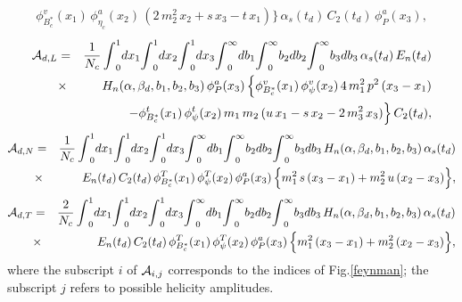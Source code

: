 \documentclass[preprint,superscriptaddress,nofootinbib]{revtex4}
\begin{document}
\begin{appendix}
\begin{eqnarray}
  {\phi}_{B_{c}^{\ast}}^{v}(x_{1})\, {\phi}_{{\eta}_{c}}^{a}(x_{2})\,
   (2\,m_{2}^{2}\,x_{2}+s\,x_{3}-t\,x_{1}) \Big\}\,
  {\alpha}_{s}(t_{d})\, C_{2}(t_{d})\, {\phi}_{P}^{a}(x_{3})
   \label{amp:d-01},
   \end{eqnarray}
   \begin{eqnarray}
  {\cal A}_{d,L} &=&
   \frac{1}{N_{c}}\,
  {\int}_{0}^{1}dx_{1}
  {\int}_{0}^{1}dx_{2}
  {\int}_{0}^{1}dx_{3}
  {\int}_{0}^{\infty}db_{1}
  {\int}_{0}^{\infty}b_{2}db_{2}
  {\int}_{0}^{\infty}b_{3}db_{3}\,
  {\alpha}_{s}(t_{d})\, E_{n}(t_{d})
   \nonumber \\ &{\times}&
  H_{n}({\alpha},{\beta}_{d},b_{1},b_{2},b_{3})\,
  {\phi}_{P}^{a}(x_{3})\, \Big\{
  {\phi}_{B_{c}^{\ast}}^{v}(x_{1})\, {\phi}_{\psi}^{v}(x_{2})\,
  4\,m_{1}^{2}\,p^{2}\,(x_{3}-x_{1})
  \nonumber \\ & & \quad -
 {\phi}_{B_{c}^{\ast}}^{t}(x_{1})\, {\phi}_{\psi}^{t}(x_{2})\,
  m_{1}\,m_{2}\,(u\,x_{1}-s\,x_{2}-2\,m_{3}^{2}\,x_{3})
   \Big\}\, C_{2}(t_{d})
   \label{amp:d-02},
   \end{eqnarray}
   \begin{eqnarray}
  {\cal A}_{d,N} &=&
   \frac{1}{N_{c}}\,
  {\int}_{0}^{1}dx_{1}
  {\int}_{0}^{1}dx_{2}
  {\int}_{0}^{1}dx_{3}
  {\int}_{0}^{\infty}db_{1}
  {\int}_{0}^{\infty}b_{2}db_{2}
  {\int}_{0}^{\infty}b_{3}db_{3}\,
  H_{n}({\alpha},{\beta}_{d},b_{1},b_{2},b_{3})\,
  {\alpha}_{s}(t_{d})
   \nonumber \\ &{\times}&
  E_{n}(t_{d})\, C_{2}(t_{d})\, {\phi}_{B_{c}^{\ast}}^{T}(x_{1})\,
  {\phi}_{\psi}^{T}(x_{2})\, {\phi}_{P}^{a}(x_{3})\,
  \Big\{ m_{1}^{2}\,s\,(x_{3}-x_{1})
  + m_{2}^{2}\,u\,(x_{2}-x_{3}) \Big\}
   \label{amp:d-03},
   \end{eqnarray}
   \begin{eqnarray}
  {\cal A}_{d,T} &=&
   \frac{2}{N_{c}}\,
  {\int}_{0}^{1}dx_{1}
  {\int}_{0}^{1}dx_{2}
  {\int}_{0}^{1}dx_{3}
  {\int}_{0}^{\infty}db_{1}
  {\int}_{0}^{\infty}b_{2}db_{2}
  {\int}_{0}^{\infty}b_{3}db_{3}\,
  H_{n}({\alpha},{\beta}_{d},b_{1},b_{2},b_{3})\,
  {\alpha}_{s}(t_{d})
   \nonumber \\ &{\times}&
  E_{n}(t_{d})\, C_{2}(t_{d})\,
  {\phi}_{B_{c}^{\ast}}^{T}(x_{1})\,
  {\phi}_{\psi}^{T}(x_{2})\, {\phi}_{P}^{a}(x_{3})\,
  \Big\{ m_{1}^{2}\,(x_{3}-x_{1})
  + m_{2}^{2}\,(x_{2}-x_{3}) \Big\}
   \label{amp:d-04},
   \end{eqnarray}
  where the subscript $i$ of ${\cal A}_{i,j}$ corresponds to
  the indices of Fig.\ref{feynman}; the subscript $j$ refers
  to possible helicity amplitudes.


\end{appendix}
\end{document}
